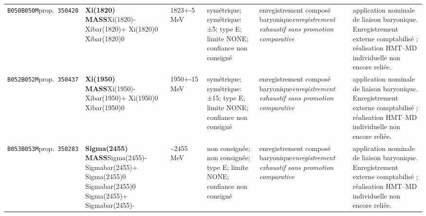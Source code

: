 \begin{landscape}
\begin{longtable}{L{1.85cm}L{4.45cm}L{2.35cm}L{4.05cm}L{3.35cm}L{7.15cm}}
\texttt{B050}\newline \texttt{B050M}\newline prop.\ \texttt{350420} & \textbf{Xi(1820) MASS}\newline Xi(1820)- \textbar{}\allowbreak{} Xibar(1820)+ \textbar{}\allowbreak{} Xi(1820)0 \textbar{}\allowbreak{} Xibar(1820)0 & 1823+-5\,MeV & symétrique; symétrique: ±5; type E; limite NONE; confiance non consigné & enregistrement composé baryonique\newline \emph{enregistrement exhaustif sans promotion comparative} & application nominale de liaison baryonique. Enregistrement externe comptabilisé ; réalisation HMT--MD individuelle non encore reliée. \\
\texttt{B052}\newline \texttt{B052M}\newline prop.\ \texttt{350437} & \textbf{Xi(1950) MASS}\newline Xi(1950)- \textbar{}\allowbreak{} Xibar(1950)+ \textbar{}\allowbreak{} Xi(1950)0 \textbar{}\allowbreak{} Xibar(1950)0 & 1950+-15\,MeV & symétrique; symétrique: ±15; type E; limite NONE; confiance non consigné & enregistrement composé baryonique\newline \emph{enregistrement exhaustif sans promotion comparative} & application nominale de liaison baryonique. Enregistrement externe comptabilisé ; réalisation HMT--MD individuelle non encore reliée. \\
\texttt{B053}\newline \texttt{B053M}\newline prop.\ \texttt{350283} & \textbf{Sigma(2455) MASS}\newline Sigma(2455)- \textbar{}\allowbreak{} Sigmabar(2455)+ \textbar{}\allowbreak{} Sigma(2455)0 \textbar{}\allowbreak{} Sigmabar(2455)0 \textbar{}\allowbreak{} Sigma(2455)+ \textbar{}\allowbreak{} Sigmabar(2455)- & \textasciitilde{}2455\,MeV & non consignée; non consignée; type E; limite NONE; confiance non consigné & enregistrement composé baryonique\newline \emph{enregistrement exhaustif sans promotion comparative} & application nominale de liaison baryonique. Enregistrement externe comptabilisé ; réalisation HMT--MD individuelle non encore reliée. \\

\end{longtable}
\end{landscape}
